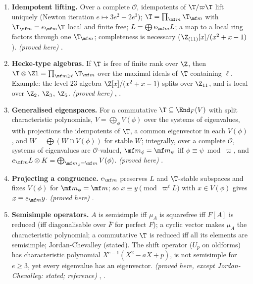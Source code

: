 \begin{enumerate}[label=\textbf{\thechapter.\arabic*}]
$\pi\colon\T\onto\mathcal O$, $\T=\mathcal O\oplus\wp$, $\mf m_\pi=\wp+\varpi\T$, and $\pi_K$ factors through exactly one local factor of $\T_K$. \emph{(proved here)}
.
\item \textbf{Idempotent lifting.} Over a complete $\mathcal O$, idempotents of $\T/\varpi\T$ lift uniquely (Newton iteration $e\mapsto3e^2-2e^3$); $\T=\prod_{\mf m}\T_{\mf m}$ with $\T_{\mf m}=e_{\mf m}\T$
local and finite free; $L=\bigoplus e_{\mf m}L$; a map to a local ring factors through one $\T_{\mf m}$; completeness is necessary ($\Z_{(11)}[x]/(x^2+x-1)$). \emph{(proved here)}
.
\item \textbf{Hecke-type algebras.} If $\T$ is free of finite rank over $\Z$, then $\T\otimes\Zl=\prod_{\mf m\ni\ell}\T_{\mf m}$ over the maximal ideals of $\T$ containing $\ell$. Example: the
level-$23$ algebra $\Z[x]/(x^2+x-1)$ splits over $\Z_{11}$, and is local over $\Z_2$, $\Z_3$, $\Z_5$. \emph{(proved here)} , .
\item \textbf{Generalised eigenspaces.} For a commutative $\T\subseteq\End_F(V)$ with split characteristic polynomials, $V=\bigoplus_\phi V(\phi)$ over the systems of eigenvalues, with
projections the idempotents of $\T$, a common eigenvector in each $V(\phi)$, and $W=\bigoplus(W\cap V(\phi))$ for stable $W$; integrally, over a complete $\mathcal O$, systems
of eigenvalues are $\mathcal O$-valued, $\mf m_\phi=\mf m_\psi$ iff $\phi\equiv\psi\bmod\varpi$, and $e_{\mf m}L\otimes K=\bigoplus_{\mf m_\phi=\mf m}V(\phi)$. \emph{(proved here)}
.
\item \textbf{Projecting a congruence.} $e_{\mf m}$ preserves $L$ and $\T$-stable subspaces and fixes $V(\phi)$ for $\mf m_\phi=\mf m$; so $x\equiv y\pmod{\varpi^tL}$ with $x\in V(\phi)$ gives
$x\equiv e_{\mf m}y$. \emph{(proved here)} .
\item \textbf{Semisimple operators.} $A$ is semisimple iff $\mu_A$ is squarefree iff $F[A]$ is reduced (iff diagonalisable over $\overline F$ for perfect $F$); a cyclic vector makes
$\mu_A$ the characteristic polynomial; a commutative $\T$ is reduced iff all its elements are semisimple; Jordan-Chevalley (stated). The shift operator ($U_p$ on
oldforms) has characteristic polynomial $X^{e-1}(X^2-aX+p)$, is not semisimple for $e\ge3$, yet every eigenvalue has an eigenvector. \emph{(proved here, except
Jordan-Chevalley: stated; reference)} , .

\end{enumerate}
